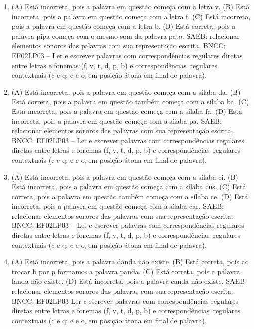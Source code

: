 \begin{enumerate}
\item
(A) Está incorreta, pois a palavra em questão começa com a letra v.
(B) Está incorreta, pois a palavra em questão começa com a letra f.
(C) Está incorreta, pois a palavra em questão começa com a letra b.
(D) Está correta, pois a palavra pipa começa com o mesmo som da palavra pato.
SAEB: relacionar elementos sonoros das palavras com sua representação
escrita.
BNCC: EF02LP03 -- Ler e escrever palavras com correspondências
regulares diretas entre letras e fonemas (f, v, t, d, p, b) e
correspondências~regulares contextuais (c e q; e e o, em posição átona
em final de palavra).

\item
(A) Está incorreta, pois a palavra em questão começa com a sílaba da.
(B) Está correta, pois a palavra em questão também começa com a sílaba ba.
(C) Está incorreta, pois a palavra em questão começa com a sílaba fa.
(D) Está incorreta, pois a palavra em questão começa com a sílaba pa.
SAEB: relacionar elementos sonoros das palavras com sua representação escrita.
BNCC: EF02LP03 -- Ler e escrever palavras com correspondências
regulares diretas entre letras e fonemas (f, v, t, d, p, b) e
correspondências~regulares contextuais (c e q; e e o, em posição átona
em final de palavra).

\item
(A) Está incorreta, pois a palavra em questão começa com a sílaba ci.
(B) Está incorreta, pois a palavra em questão começa com a sílaba cus.
(C) Está correta, pois a palavra em questão também começa com a sílaba ce.
(D) Está incorreta, pois a palavra em questão começa com a sílaba car.
SAEB: relacionar elementos sonoros das palavras com sua representação escrita.
BNCC: EF02LP03 -- Ler e escrever palavras com correspondências
regulares diretas entre letras e fonemas (f, v, t, d, p, b) e
correspondências~regulares contextuais (c e q; e e o, em posição átona
em final de palavra).

\item
(A) Está incorreta, pois a palavra danda não existe.
(B) Está correta, pois ao trocar b por p formamos a palavra panda.
(C) Está correta, pois a palavra fanda não existe.
(D) Está incorreta, pois a palavra canda não existe.
SAEB relacionar elementos sonoros das palavras com sua representação escrita.
BNCC: EF02LP03 Ler e escrever palavras com correspondências
regulares diretas entre letras e fonemas (f, v, t, d, p, b) e
correspondências~regulares contextuais (c e q; e e o, em posição átona
em final de palavra).


\end{enumerate}

